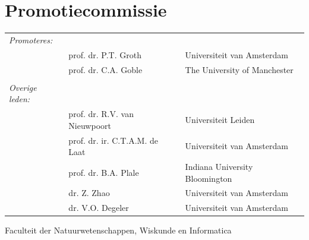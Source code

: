 \newpage

\section*{Promotiecommissie}

\begin{tabular}{lll}

\textit{Promoteres:}  &  & \\
     & prof. dr. P.T. Groth     & Universiteit van Amsterdam \\
     & prof. dr. C.A. Goble & The University of Manchester \\
	& & \\     

\textit{Overige leden:} & & \\
     &  prof. dr. R.V. van Nieuwpoort   & Universiteit Leiden \\
     &  prof. dr. ir. C.T.A.M. de Laat  & Universiteit van Amsterdam \\
     &  prof. dr. B.A. Plale     & Indiana University Bloomington  \\     
     &  dr. Z. Zhao         & Universiteit van Amsterdam  \\     
     &  dr. V.O. Degeler     & Universiteit van Amsterdam \\
\end{tabular}

Faculteit der Natuurwetenschappen, Wiskunde en Informatica
